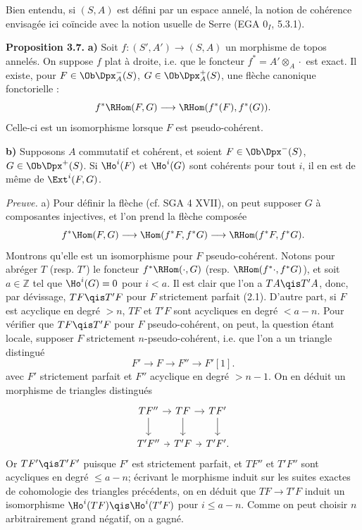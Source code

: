 \documentclass[11pt]{article}
\begin{document}
Bien entendu, si \((S,A)\) est défini par un espace annelé, la notion de cohérence envisagée ici coïncide avec la notion usuelle de Serre (EGA \(0_I\), 5.3.1).

\textbf{Proposition 3.7.} \textbf{a)} Soit \(f:(S',A')\to(S,A)\) un morphisme de topos annelés. On suppose \(f\) plat à droite, i.e. que le foncteur \(f^*=A'\otimes_A\cdot\) est exact. Il existe, pour \(F\in\Ob\Dpx_A^-(S)\), \(G\in\Ob\Dpx_A^+(S)\), une flèche canonique fonctorielle :
\[
  f^*\RHom(F,G)\longrightarrow\RHom(f^*(F),f^*(G)).
\]
Celle-ci est un isomorphisme lorsque \(F\) est pseudo-cohérent.

\textbf{b)} Supposons \(A\) commutatif et cohérent, et soient \(F\in\Ob\Dpx^-(S)\), \(G\in\Ob\Dpx^+(S)\). Si \(\Ho^i(F)\) et \(\Ho^i(G)\) sont cohérents pour tout \(i\), il en est de même de \(\Ext^i(F,G)\).

\emph{Preuve.} a) Pour définir la flèche (cf. SGA 4 XVII), on peut supposer \(G\) à composantes injectives, et l'on prend la flèche composée
\[
  f^*\Hom(F,G)\longrightarrow\Hom(f^*F,f^*G)\longrightarrow\RHom(f^*F,f^*G).
\]
Montrons qu'elle est un isomorphisme pour \(F\) pseudo-cohérent. Notons pour abréger \(T\) (resp. \(T'\)) le foncteur \(f^*\RHom(\cdot,G)\) (resp. \(\RHom(f^*\cdot,f^*G)\)), et soit \(a\in\mathbb Z\) tel que \(\Ho^i(G)=0\) pour \(i<a\). Il est clair que l'on a \(TA\qis T'A\), donc, par dévissage, \(TF\qis T'F\) pour \(F\) strictement parfait (2.1). D'autre part, si \(F\) est acyclique en degré \(>n\), \(TF\) et \(T'F\) sont acycliques en degré \(<a-n\). Pour vérifier que \(TF\qis T'F\) pour \(F\) pseudo-cohérent, on peut, la question étant locale, supposer \(F\) strictement \(n\)-pseudo-cohérent, i.e. que l'on a un triangle distingué
\[
  F'\longrightarrow F\longrightarrow F''\longrightarrow F'[1].
\]
avec \(F'\) strictement parfait et \(F''\) acyclique en degré \(>n-1\). On en déduit un morphisme de triangles distingués
\[
\begin{tikzcd}[column sep=tiny]
TF'' \arrow[r]\arrow[d]&TF\arrow[r]\arrow[d]&TF'\arrow[d]\\
T'F''\arrow[r]&T'F\arrow[r]&T'F' .
\end{tikzcd}
\]
Or \(TF'\qis T'F'\) puisque \(F'\) est strictement parfait, et \(TF''\) et \(T'F''\) sont acycliques en degré \(\leq a-n\); écrivant le morphisme induit sur les suites exactes de cohomologie des triangles précédents, on en déduit que \(TF\to T'F\) induit un isomorphisme \(\Ho^i(TF)\qis\Ho^i(T'F)\) pour \(i\leq a-n\). Comme on peut choisir \(n\) arbitrairement grand négatif, on a gagné.
\end{document}
